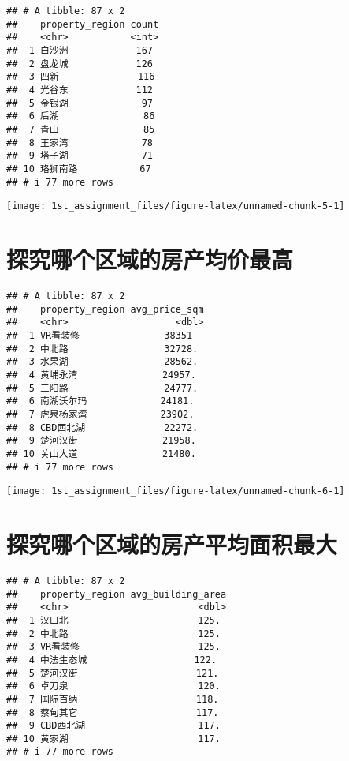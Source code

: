 \documentclass[
]{article}
\begin{document}
\begin{verbatim}
## # A tibble: 87 x 2
##    property_region count
##    <chr>           <int>
##  1 白沙洲            167
##  2 盘龙城            126
##  3 四新              116
##  4 光谷东            112
##  5 金银湖             97
##  6 后湖               86
##  7 青山               85
##  8 王家湾             78
##  9 塔子湖             71
## 10 珞狮南路           67
## # i 77 more rows
\end{verbatim}

\begin{center}\texttt{[image: 1st\_assignment\_files/figure-latex/unnamed-chunk-5-1]} \end{center}

\section{探究哪个区域的房产均价最高}\label{ux63a2ux7a76ux54eaux4e2aux533aux57dfux7684ux623fux4ea7ux5747ux4ef7ux6700ux9ad8}

\begin{verbatim}
## # A tibble: 87 x 2
##    property_region avg_price_sqm
##    <chr>                   <dbl>
##  1 VR看装修               38351 
##  2 中北路                 32728.
##  3 水果湖                 28562.
##  4 黄埔永清               24957.
##  5 三阳路                 24777.
##  6 南湖沃尔玛             24181.
##  7 虎泉杨家湾             23902.
##  8 CBD西北湖              22272.
##  9 楚河汉街               21958.
## 10 关山大道               21480.
## # i 77 more rows
\end{verbatim}

\begin{center}\texttt{[image: 1st\_assignment\_files/figure-latex/unnamed-chunk-6-1]} \end{center}

\section{探究哪个区域的房产平均面积最大}\label{ux63a2ux7a76ux54eaux4e2aux533aux57dfux7684ux623fux4ea7ux5e73ux5747ux9762ux79efux6700ux5927}

\begin{verbatim}
## # A tibble: 87 x 2
##    property_region avg_building_area
##    <chr>                       <dbl>
##  1 汉口北                       125.
##  2 中北路                       125.
##  3 VR看装修                     125.
##  4 中法生态城                   122.
##  5 楚河汉街                     121.
##  6 卓刀泉                       120.
##  7 国际百纳                     118.
##  8 蔡甸其它                     117.
##  9 CBD西北湖                    117.
## 10 黄家湖                       117.
## # i 77 more rows
\end{verbatim}
\end{document}

